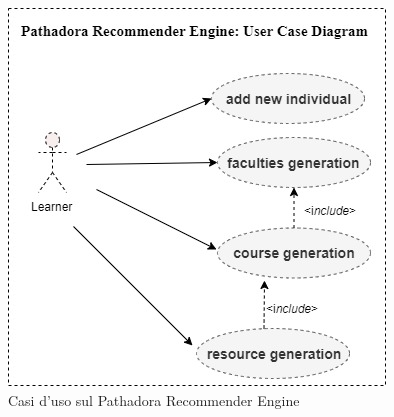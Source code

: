 \begin{figure}[H]
\centering
\includegraphics[scale=0.4]{res/pathadora-engine.jpg}
\caption{Casi d'uso sul Pathadora Recommender Engine}
\label{fig:pathadora-engine}
\end{figure}

